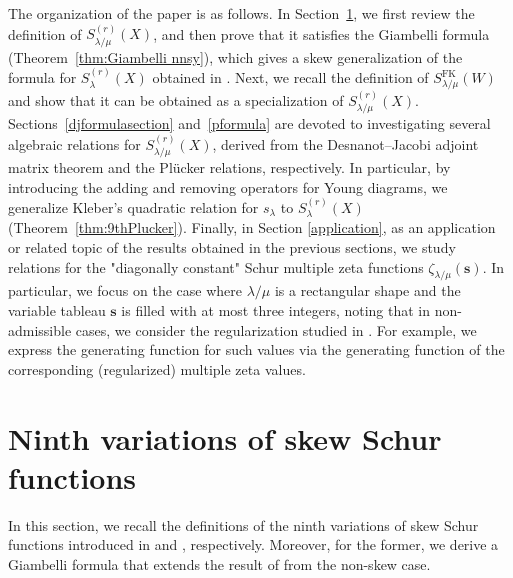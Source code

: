 \documentclass[12pt]{amsart}%
\theoremstyle{definition}
\newcommand{\NNSY}{\mathrm{NNSY}}
\newcommand{\FK}{\mathrm{FK}}
\begin{document}

The organization of the paper is as follows.  
In Section~\ref{sec:nnsy9th}, we first review the definition of $S^{(r)}_{\lambda/\mu}(X)$,  
and then prove that it satisfies the Giambelli formula (Theorem~\ref{thm:Giambelli nnsy}),  
which gives a skew generalization of the formula for $S^{(r)}_{\lambda}(X)$ obtained in \cite{nnsy}. Next, we recall the definition of $S^{\FK}_{\lambda/\mu}(W)$ 
and show that it can be obtained as a specialization of $S^{(r)}_{\lambda/\mu}(X)$.
Sections~\ref{djformulasection} and~\ref{pformula} are devoted to investigating several algebraic relations for $S^{(r)}_{\lambda/\mu}(X)$, derived from the Desnanot–Jacobi adjoint matrix theorem and the Pl\"ucker relations, respectively.
In particular, by introducing the adding and removing operators for Young diagrams, we generalize Kleber’s quadratic relation for $s_{\lambda}$ \cite{k01} to $S^{(r)}_{\lambda}(X)$ (Theorem~\ref{thm:9thPlucker}).
Finally, in Section \ref{application}, as an application or related topic of the results obtained in the previous sections, we study relations for the "diagonally constant" Schur multiple zeta functions $\zeta_{\lambda/\mu}(\boldsymbol{s})$. In particular, we focus on the case where $\lambda/\mu$ is a rectangular shape and the variable tableau $\boldsymbol{s}$ is filled with at most three integers, noting that in non-admissible cases, we consider the regularization studied in \cite{bc}.
For example, we express the generating function for such values via the generating function of the corresponding (regularized) multiple zeta values.



\section{Ninth variations of skew Schur functions}
\label{sec:nnsy9th}

In this section, we recall the definitions of the ninth variations of skew Schur functions introduced in \cite{nnsy} and \cite{fk21}, respectively.
Moreover, for the former, we derive a Giambelli formula that extends the result of \cite{nnsy} from the non-skew case.
\end{document}
